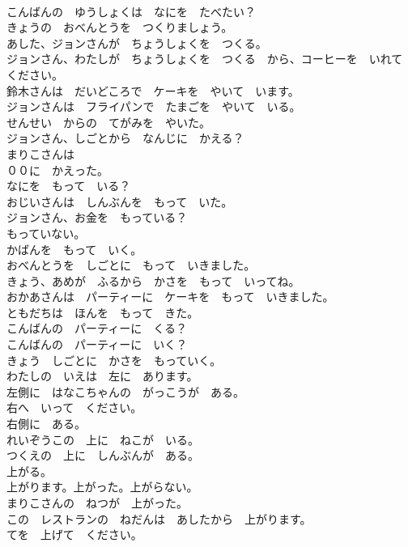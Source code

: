 \documentclass[8pt]{extreport}
\begin{document}
\begin{CJK}{UTF8}{min}
\\	こんばんの　ゆうしょくは　なにを　たべたい？	
\\	きょうの　おべんとうを　つくりましょう。	
\\	あした、ジョンさんが　ちょうしょくを　つくる。	
\\	ジョンさん、わたしが　ちょうしょくを　つくる　から、コーヒーを　いれて　ください。	
\\	鈴木さんは　だいどころで　ケーキを　やいて　います。	
\\	ジョンさんは　フライパンで　たまごを　やいて　いる。	
\\	せんせい　からの　てがみを　やいた。	
\\	ジョンさん、しごとから　なんじに　かえる？	
\\	まりこさんは　
\\	００に　かえった。	
\\	なにを　もって　いる？	
\\	おじいさんは　しんぶんを　もって　いた。	
\\	ジョンさん、お金を　もっている？	
\\	もっていない。	
\\	かばんを　もって　いく。	
\\	おべんとうを　しごとに　もって　いきました。	
\\	きょう、あめが　ふるから　かさを　もって　いってね。	
\\	おかあさんは　パーティーに　ケーキを　もって　いきました。	
\\	ともだちは　ほんを　もって　きた。	
\\	こんばんの　パーティーに　くる？	
\\	こんばんの　パーティーに　いく？	
\\	きょう　しごとに　かさを　もっていく。	
\\	わたしの　いえは　左に　あります。	
\\	左側に　はなこちゃんの　がっこうが　ある。	
\\	右へ　いって　ください。	
\\	右側に　ある。	
\\	れいぞうこの　上に　ねこが　いる。	
\\	つくえの　上に　しんぶんが　ある。	
\\	上がる。	
\\	上がります。上がった。上がらない。	
\\	まりこさんの　ねつが　上がった。	
\\	この　レストランの　ねだんは　あしたから　上がります。	
\\	てを　上げて　ください。	

\end{CJK}
\end{document}
